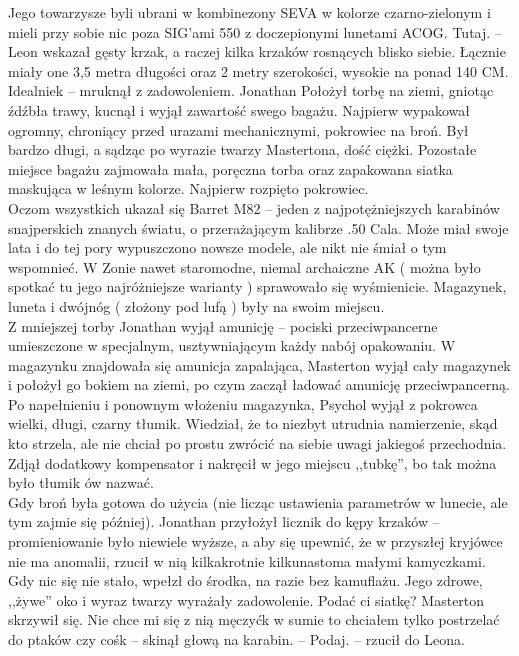 \documentclass[../MAIN.tex]{subfiles}
\begin{document}
Jego towarzysze byli ubrani w kombinezony SEVA w kolorze czarno-zielonym i mieli przy sobie nic poza SIG’ami 550 z doczepionymi lunetami ACOG.
\sx Tutaj. -- Leon wskazał gęsty krzak, a raczej kilka krzaków rosnących blisko siebie. \qd
Łącznie miały one 3,5 metra długości oraz 2 metry szerokości, wysokie na ponad 140 CM.
\sx Idealnie\3k -- mruknął z zadowoleniem. \qd
Jonathan Położył torbę na ziemi, gniotąc źdźbła trawy, kucnął i wyjął zawartość swego bagażu. Najpierw wypakował ogromny, chroniący przed urazami mechanicznymi, pokrowiec na broń. Był bardzo długi, a sądząc po wyrazie twarzy Mastertona, dość ciężki. Pozostałe miejsce bagażu zajmowała mała, poręczna torba oraz zapakowana siatka maskująca w leśnym kolorze.
Najpierw rozpięto pokrowiec. \\
Oczom wszystkich ukazał się Barret M82 -- jeden z najpotężniejszych karabinów snajperskich znanych światu, o przerażającym kalibrze .50 Cala. Może miał swoje lata i do tej pory wypuszczono nowsze modele, ale nikt nie śmiał o tym wspomnieć. W Zonie nawet staromodne, niemal archaiczne AK ( można było spotkać tu jego najróżniejsze warianty ) sprawowało się wyśmienicie. Magazynek, luneta i dwójnóg ( złożony pod lufą ) były na swoim miejscu. \\
Z mniejszej torby Jonathan wyjął amunicję -- pociski przeciwpancerne umieszczone w specjalnym, usztywniającym każdy nabój opakowaniu. W magazynku znajdowała się amunicja zapalająca, Masterton wyjął cały magazynek i położył go bokiem na ziemi, po czym zaczął ładować amunicję przeciwpancerną. \\
Po napełnieniu i ponownym włożeniu magazynka, Psychol wyjął z pokrowca wielki, długi, czarny tłumik. Wiedział, że to niezbyt utrudnia namierzenie, skąd kto strzela, ale nie chciał po prostu zwrócić na siebie uwagi jakiegoś przechodnia. Zdjął dodatkowy kompensator i nakręcił w jego miejscu ,,tubkę'', bo tak można było tłumik ów nazwać.\\
Gdy broń była gotowa do użycia (nie licząc ustawienia parametrów w lunecie, ale tym zajmie się później). Jonathan przyłożył licznik do kępy krzaków -- promieniowanie było niewiele wyższe, a aby się upewnić, że w przyszłej kryjówce nie ma anomalii, rzucił w nią kilkakrotnie kilkunastoma małymi kamyczkami. Gdy nic się nie stało, wpełzł do środka, na razie bez kamuflażu. Jego zdrowe, ,,żywe'' oko i wyraz twarzy wyrażały zadowolenie.
\sx Podać ci siatkę? \qd
Masterton skrzywił się.
\sx Nie chce mi się z nią męczyć\3k w sumie to chciałem tylko postrzelać do ptaków czy coś\3k -- skinął głową na karabin. -- Podaj. -- rzucił do Leona.
\end{document}
